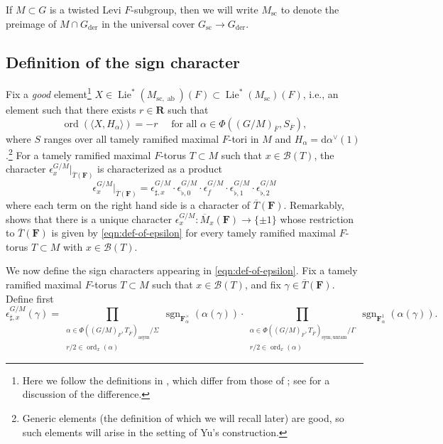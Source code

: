 \documentclass[reqno]{amsart}
\numberwithin{equation}{subsection}
\newcommand{\F}{\mathbf{F}}
\newcommand{\sgn}{\operatorname{sgn}}
\newcommand{\ol}[1]{\overline{#1}}
\newcommand{\co}{\colon}
\newcommand\cB{\mathcal{B}}
\DeclareMathOperator{\ab}{ab}
\DeclareMathOperator{\ord}{ord}
\DeclareMathOperator{\Lie}{Lie}
\DeclareMathOperator{\der}{der}
\theoremstyle{remark}
\numberwithin{equation}{subsection}
\numberwithin{figure}{subsection}
\begin{document}
If $M \subset G$ is a twisted Levi $F$-subgroup, then we will write $M_{\mathrm{sc}}$ to denote the preimage of $M \cap G_{\der}$ in the universal cover $G_{\mathrm{sc}} \to G_{\der}$.

\subsection{Definition of the sign character}\label{sssec:fks-sign-character-definition}
Fix a \emph{good} element\footnote{Here we follow the definitions in \cite{FKS23}, which differ from those of \cite{Yu01}; see \cite[Remark 4.1.3]{FKS23} for a discussion of the difference.} $X \in \Lie^*(M_{\mathrm{sc},\ab})(F) \subset \Lie^*(M_{\mathrm{sc}})(F)$, i.e., an element such that there exists $r \in \mathbf{R}$ such that
\[
\ord(\langle X, H_\alpha\rangle) = -r \quad \text{ for all $\alpha \in \Phi((G/M)_{\ol F}, S_{\ol F})$},
\]
where $S$ ranges over all tamely ramified maximal $F$-tori in $M$ and $H_\alpha = \mathrm{d}\alpha^\vee(1)$.\footnote{Generic elements (the definition of which we will recall later) are good, so such elements will arise in the setting of Yu's construction.} For a tamely ramified maximal $F$-torus $T \subset M$ such that $x\in\cB(T)$, the character $\epsilon_x^{G/M}|_{\ol T(\F)}$ is characterized as a product
\begin{equation}\label{eqn:def-of-epsilon}
\epsilon_x^{G/M}|_{\ol T(\F)} = \epsilon_{\sharp,x}^{G/M} \cdot \epsilon_{\flat,0}^{G/M} \cdot \epsilon_f^{G/M} \cdot \epsilon_{\flat,1}^{G/M} \cdot \epsilon_{\flat,2}^{G/M}
\end{equation}
where each term on the right hand side is a character of $\ol T(\F)$. Remarkably, \cite[Theorem 3.4 and Corollary 3.6]{FKS23} shows that there is a unique character $\epsilon_x^{G/M}\co \ol M_x(\F) \to \{\pm 1\}$ whose restriction to $\ol T(\F)$ is given by \eqref{eqn:def-of-epsilon} for every tamely ramified maximal $F$-torus $T \subset M$ with $x \in \cB(T)$.

We now define the sign characters appearing in \eqref{eqn:def-of-epsilon}. Fix a tamely ramified maximal $F$-torus $T \subset M$ such that $x\in\cB(T)$, and fix $\gamma \in \ol T(\F)$. Define first
\begin{equation}\label{eqn:FKS-1}
\epsilon_{\sharp,x}^{G/M}(\gamma) = \prod_{\substack{\alpha \in \Phi((G/M)_{\ol F}, T_{\ol F})_{\mathrm{asym}}/\Sigma \\ r/2 \in \ord_x(\alpha)}} \sgn_{\F_\alpha^\times}(\alpha(\gamma)) \cdot \prod_{\substack{\alpha \in \Phi((G/M)_{\ol F},T_{\ol F})_{\mathrm{sym,unram}}/\Gamma \\ r/2 \in \ord_x(\alpha)}} \sgn_{\F_\alpha^1}(\alpha(\gamma)).
\end{equation}
\end{document}
